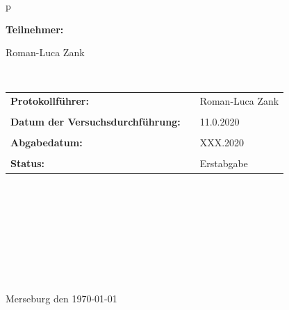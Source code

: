 \begin{center}
\begin{tabular}{p{\textwidth}}
\begin{center}
\Large{\textbf{Teilnehmer:}} \\ 
\end{center}
\begin{center}
\large{Roman-Luca Zank}
\end{center}


\\

\begin{center}
\begin{tabular}{lll}
\large{\textbf{Protokollführer:}} & &  \large{Roman-Luca Zank}\\
&&\\
\large{\textbf{Datum der Versuchsdurchführung:}}&& \large{11.0.2020}\\
&&\\
\large{\textbf{Abgabedatum:}}&& \large{XXX.2020}\\
&&\\
\large{\textbf{Status:}}&& \large{Erstabgabe}\\
\end{tabular}
\end{center}

\\ \\ \\ \\ \\ \\ \\ \\
\large{Merseburg den \today}

\end{tabular}
\end{center}
